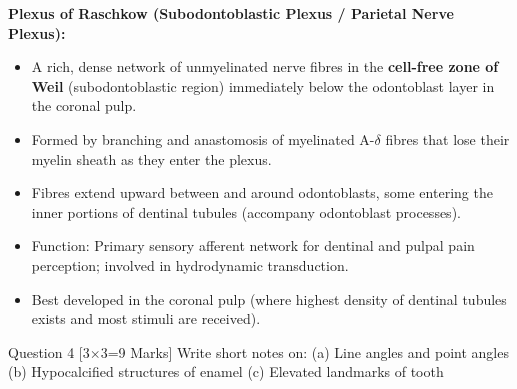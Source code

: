 \documentclass[11pt,a4paper]{article}
\begin{document}
\begin{ansbox}
\textbf{Plexus of Raschkow (Subodontoblastic Plexus / Parietal Nerve Plexus):}
\begin{itemize}[leftmargin=*]
    \item A rich, dense network of unmyelinated nerve fibres in the \textbf{cell-free zone of Weil} (subodontoblastic region) immediately below the odontoblast layer in the coronal pulp.
    \item Formed by branching and anastomosis of myelinated A-$\delta$ fibres that lose their myelin sheath as they enter the plexus.
    \item Fibres extend upward between and around odontoblasts, some entering the inner portions of dentinal tubules (accompany odontoblast processes).
    \item Function: Primary sensory afferent network for dentinal and pulpal pain perception; involved in hydrodynamic transduction.
    \item Best developed in the coronal pulp (where highest density of dentinal tubules exists and most stimuli are received).
\end{itemize}
\end{ansbox}

\begin{qbox}{Question 4 [3$\times$3=9 Marks]}
Write short notes on: (a) Line angles and point angles \quad (b) Hypocalcified structures of enamel \quad (c) Elevated landmarks of tooth
\end{qbox}
\end{document}
